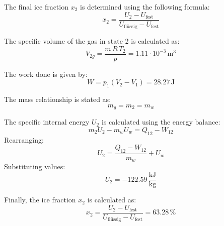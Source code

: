 The final ice fraction \( x_2 \) is determined using the following formula:  
\[
x_2 = \frac{U_2 - U_{\text{fest}}}{U_{\text{flüssig}} - U_{\text{fest}}}
\]  

The specific volume of the gas in state 2 is calculated as:  
\[
V_{2g} = \frac{m \, R \, T_2}{p} = 1.11 \cdot 10^{-3} \, \text{m}^3
\]  

The work done is given by:  
\[
W = p_1 (V_2 - V_1) = 28.27 \, \text{J}
\]  

The mass relationship is stated as:  
\[
m_g = m_2 = m_w
\]  

The specific internal energy \( U_2 \) is calculated using the energy balance:  
\[
m_2 U_2 - m_w U_w = Q_{12} - W_{12}
\]  
Rearranging:  
\[
U_2 = \frac{Q_{12} - W_{12}}{m_w} + U_w
\]  
Substituting values:  
\[
U_2 = -122.59 \, \frac{\text{kJ}}{\text{kg}}
\]  

Finally, the ice fraction \( x_2 \) is calculated as:  
\[
x_2 = \frac{U_2 - U_{\text{fest}}}{U_{\text{flüssig}} - U_{\text{fest}}} = 63.28 \, \%
\]